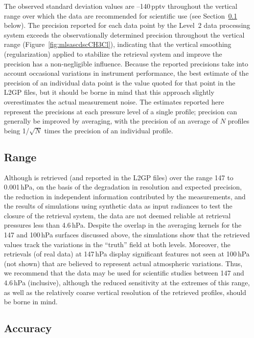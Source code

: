 The observed standard deviation values are --140\,pptv throughout the vertical range over which the data are recommended for scientific use (see Section~\ref{sec:CH3Clrange} below). The precision reported for each data point by the Level~2 data processing system exceeds the observationally determined precision throughout the vertical range (Figure~\ref{fig:mlsascdscCH3Cl}), indicating that the vertical smoothing (regularization) applied to stabilize the retrieval system and improve the precision has a non-negligible influence. Because the reported precisions take into account occasional variations in instrument performance, the best estimate of the precision of an individual data point is the value quoted for that point in the L2GP files, but it should be borne in mind that this approach slightly overestimates the actual measurement noise. The estimates reported here represent the precisions at each pressure level of a single profile; precision can generally be improved by averaging, with the precision of an average of $N$ profiles being 1/$\sqrt{N}$ times the precision of an individual profile.

\subsection{Range}
\label{sec:CH3Clrange}

Although  is retrieved (and reported in the L2GP files) over the range 147 to 0.001\,hPa, on the basis of the degradation in resolution and expected precision, the reduction in independent information contributed by the measurements, and the results of simulations using synthetic data as input radiances to test the closure of the retrieval system, the data are not deemed reliable at retrieval pressures less than 4.6\,hPa. Despite the overlap in the averaging kernels for the 147 and 100\,hPa surfaces discussed above, the simulations show that the retrieved  values track the variations in the ``truth'' field at both levels. Moreover, the retrievals (of real data) at 147\,hPa display significant features not seen at 100\,hPa (not shown) that are believed to represent actual atmospheric variations. Thus, we recommend that the \thisv {} data may be used for scientific studies between 147 and 4.6\,hPa (inclusive), although the reduced sensitivity at the extremes of this range, as well as the relatively coarse vertical resolution of the retrieved profiles, should be borne in mind.

\subsection{Accuracy}
\label{sec:ch3clacc}


